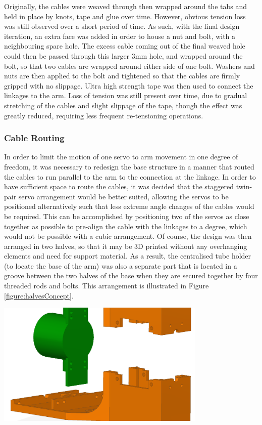 \documentclass[11pt]{article}
\begin{document}
Originally, the cables were weaved through then wrapped around the tabs and held in place by knots, tape and glue over time. However, obvious tension loss was still observed over a short period of time. As such, with the final design iteration, an extra face was added in order to house a nut and bolt, with a neighbouring spare hole. The excess cable coming out of the final weaved hole could then be passed through this larger 3mm hole, and wrapped around the bolt, so that two cables are wrapped around either side of one bolt. Washers and nuts are then applied to the bolt and tightened so that the cables are firmly gripped with no slippage. Ultra high strength tape was then used to connect the linkages to the arm. Loss of tension was still present over time, due to gradual stretching of the cables and slight slippage of the tape, though the effect was greatly reduced, requiring less frequent re-tensioning operations.

\subsubsection{Cable Routing}
In order to limit the motion of one servo to arm movement in one degree of freedom, it was necessary to redesign the base structure in a manner that routed the cables to run parallel to the arm to the connection at the linkage. In order to have sufficient space to route the cables, it was decided that the staggered twin-pair servo arrangement would be better suited, allowing the servos to be positioned alternatively such that less extreme angle changes of the cables would be required. This can be accomplished by positioning two of the servos as close together as possible to pre-align the cable with the linkages to a degree, which would not be possible with a cubic arrangement. Of course, the design was then arranged in two halves, so that it may be 3D printed without any overhanging elements and need for support material. As a result, the centralised tube holder (to locate the base of the arm) was also a separate part that is located in a groove between the two halves of the base when they are secured together by four threaded rods and bolts. This arrangement is illustrated in Figure \ref{figure:halvesConcept}.

\begin{center}
\includegraphics[width=0.75\textwidth]{images/halvesConcept.png}
\label{figure:halvesConcept}
\end{center}
\end{document}

